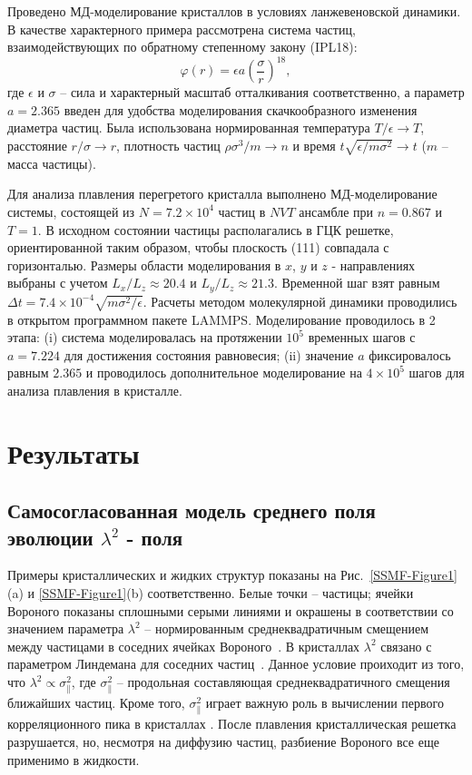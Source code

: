 Проведено МД-моделирование кристаллов в условиях ланжевеновской динамики.
В качестве характерного примера рассмотрена система частиц, взаимодействующих по обратному степенному закону (IPL18):
\begin{equation}
\label{SSMF-eq3}
\varphi(r) = \epsilon a \left(\frac{\sigma}{r}\right)^{18},
\end{equation}
где $\epsilon$ и $\sigma$ -- сила и характерный масштаб отталкивания соответственно,
а параметр $ a = 2.365 $ введен для удобства моделирования скачкообразного изменения диаметра частиц.
Была использована нормированная температура $ T/ \epsilon \rightarrow T $, расстояние $ r/ \sigma \rightarrow r $, плотность частиц $\rho\sigma^3/m\rightarrow n$ и время $t\sqrt{\epsilon/m\sigma^2} \rightarrow t$ ($m$ -- масса частицы).

Для анализа плавления перегретого кристалла выполнено МД-моделирование системы, состоящей из $ N = 7.2 \times 10 ^ 4 $ частиц в $NVT$ ансамбле при $n=0.867$ и $T=1$.
В исходном состоянии частицы располагались в ГЦК решетке, ориентированной таким образом, чтобы плоскость (111) совпадала с горизонталью.
Размеры области моделирования в $ x $, $ y $ и $ z $ - направлениях выбраны с учетом $ L_x / L_z \approx 20.4 $ и $ L_y / L_z \approx 21.3 $.
Временной шаг взят равным $ \Delta t = 7.4 \times 10 ^ {- 4} \sqrt {m \sigma ^ 2 / \epsilon}$.
Расчеты методом молекулярной динамики проводились в открытом программном пакете LAMMPS.
Моделирование проводилось в 2 этапа: (i) система моделировалась на протяжении $ 10 ^ 5 $ временных шагов с $ a = 7.224 $ для достижения состояния равновесия; (ii) значение $a$ фиксировалось равным $ 2.365 $ и проводилось дополнительное моделирование на $ 4 \times 10 ^ 5 $ шагов для анализа плавления в кристалле.

\section{Результаты}
\subsection{Самосогласованная модель среднего поля эволюции $\lambda^2$ - поля}

Примеры кристаллических и жидких структур показаны на Рис.~\ref{SSMF-Figure1}(a) и \ref{SSMF-Figure1}(b) соответственно.
Белые точки -- частицы; ячейки Вороного показаны сплошными серыми линиями и окрашены в соответствии со значением параметра $\lambda^2$ -- нормированным среднеквадратичным смещением между частицами в соседних ячейках Вороного~\cite{10.1021/acs.jpcc.7b09317}.
В кристаллах $\lambda^2$ связано с параметром Линдемана для соседних частиц~\cite{10.1016/0375-9601(85)90617-6}.
Данное условие проиходит из того, что $\lambda^2\propto \sigma_ \| ^ 2 $, где $ \sigma_ \| ^ 2 $ -- продольная составляющая среднеквадратичного смещения ближайших частиц.
Кроме того, $ \sigma_ \| ^ 2 $ играет важную роль в вычислении первого корреляционного пика в кристаллах \cite{10.1063/1.4869863, 10.1063/1.4926945, 10.1088/0953-8984/28/23/235401, 10.1039/c7sm02429k, 10.1063/1.5116176}.
После плавления кристаллическая решетка разрушается, но, несмотря на диффузию частиц, разбиение Вороного все еще применимо в жидкости.

